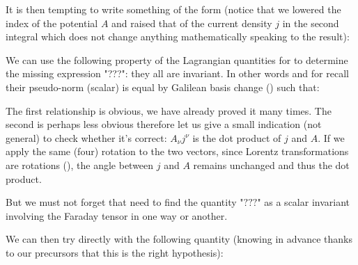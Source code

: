 	It is then tempting to write something of the form (notice that we lowered the index of the potential $A$ and raised that of the current density $j$ in the second integral which does not change anything mathematically speaking to the result):
	
	We can use the following property of the Lagrangian quantities for to determine the missing expression "???": they all are invariant. In other words and for recall their pseudo-norm (scalar) is equal by Galilean basis change () such that:
	
	The first relationship is obvious, we have already proved it many times. The second is perhaps less obvious therefore let us give a small indication (not general) to check whether it's correct: $A_\nu j^\nu$ is the dot product of $j$ and $A$. If we apply the same (four) rotation to the two vectors, since Lorentz transformations are rotations (), the angle between $j$ and $A$ remains unchanged and thus the dot product.

	But we must not forget that need to find the quantity "$???$" as a scalar invariant involving the Faraday tensor in one way or another.

	We can then try directly with the following quantity (knowing in advance thanks to our precursors that this is the right hypothesis):
	
